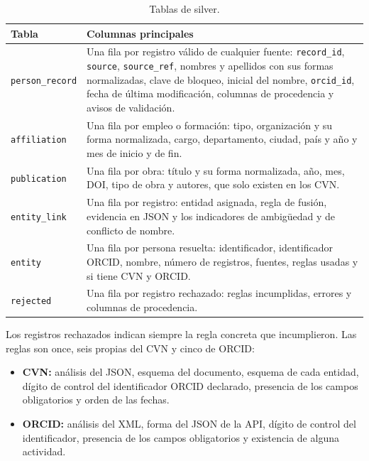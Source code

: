 \begin{table}[H]
  \centering
  \footnotesize
  \renewcommand{\arraystretch}{1.1}
  \begin{tabular}{
    >{\raggedright\arraybackslash}p{}
    >{\raggedright\arraybackslash}p{}}
    \hline
    \textbf{Tabla} & \textbf{Columnas principales} \\
    \hline
    \texttt{person\_record} & Una fila por registro válido de cualquier fuente: \texttt{record\_id}, \texttt{source}, \texttt{source\_ref}, nombres y apellidos con sus formas normalizadas, clave de bloqueo, inicial del nombre, \texttt{orcid\_id}, fecha de última modificación, columnas de procedencia y avisos de validación. \\
    \texttt{affiliation} & Una fila por empleo o formación: tipo, organización y su forma normalizada, cargo, departamento, ciudad, país y año y mes de inicio y de fin. \\
    \texttt{publication} & Una fila por obra: título y su forma normalizada, año, mes, DOI, tipo de obra y autores, que solo existen en los CVN. \\
    \texttt{entity\_link} & Una fila por registro: entidad asignada, regla de fusión, evidencia en JSON y los indicadores de ambigüedad y de conflicto de nombre. \\
    \texttt{entity} & Una fila por persona resuelta: identificador, identificador ORCID, nombre, número de registros, fuentes, reglas usadas y si tiene CVN y ORCID. \\
    \texttt{rejected} & Una fila por registro rechazado: reglas incumplidas, errores y columnas de procedencia. \\
    \hline
  \end{tabular}
  \caption{Tablas de silver.}
  \label{tab:anexo_silver}
\end{table}

Los registros rechazados indican siempre la regla concreta que incumplieron.
Las reglas son once, seis propias del CVN y cinco de ORCID:

\begin{itemize}
  \item \textbf{CVN:} análisis del JSON, esquema del documento, esquema de cada
  entidad, dígito de control del identificador ORCID declarado, presencia de
  los campos obligatorios y orden de las fechas.
  \item \textbf{ORCID:} análisis del XML, forma del JSON de la API, dígito de
  control del identificador, presencia de los campos obligatorios y
  existencia de alguna actividad.
\end{itemize}

